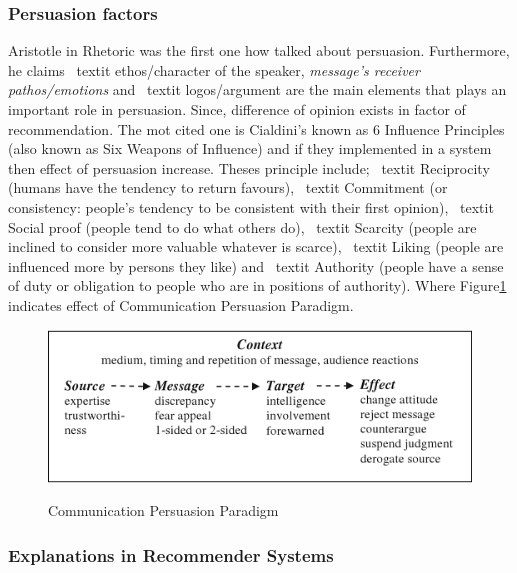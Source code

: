 \subsubsection{Persuasion factors}

Aristotle in Rhetoric \cite{gkika2014persuasive} was the first one how talked about persuasion. Furthermore, he claims \ textit { ethos/character of the speaker},  \textit { message’s receiver pathos/emotions} and \ textit{ logos/argument} are the main elements that plays an important role in persuasion. Since, difference of opinion exists in factor of recommendation. The mot cited one is  Cialdini’s \cite{cialdini2009influence} known as 6 Influence Principles (also known as Six Weapons of Influence) and if they implemented in a system then effect of persuasion increase. Theses principle include; \ textit{ Reciprocity} (humans have the tendency to return favours), \ textit{ Commitment }(or consistency: people’s tendency to be consistent with their first opinion), \ textit{ Social proof }(people tend to do what others do), \ textit{ Scarcity} (people are inclined to consider more valuable whatever is scarce), \ textit{ Liking }(people are influenced more by persons they like) and  \ textit{ Authority} (people have a sense of duty or obligation to people who are in positions of authority). Where Figure\ref{fig:ch2_communication_persuasion_paradigm} indicates effect of Communication Persuasion Paradigm\cite{yoo2012persuasive}.

\begin{figure}[h]
	\centering
	\includegraphics[width=1\linewidth]{figures/ch2_communication_persuasion_paradigm.png}
	\caption{Communication Persuasion Paradigm}
	\cite{ yoo2012persuasive}
	\label{fig:ch2_communication_persuasion_paradigm}
\end{figure}

\newpage
\subsubsection{Explanations in Recommender Systems}

